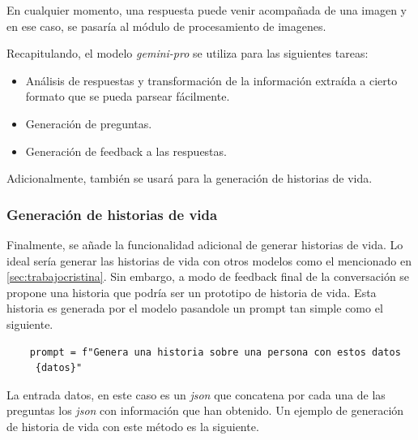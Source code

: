 En cualquier momento, una respuesta puede venir acompañada de una imagen y en ese caso, se pasaría al módulo de procesamiento de imagenes.

Recapitulando, el modelo \textit{gemini-pro} se utiliza para las siguientes tareas: 
\begin{itemize}
	\item Análisis de respuestas y transformación de la información extraída a cierto formato que se pueda parsear fácilmente.
	\item Generación de preguntas.
	\item Generación de feedback a las respuestas.
\end{itemize}

Adicionalmente, también se usará para la generación de historias de vida.

\subsubsection{Generación de historias de vida}
Finalmente, se añade la funcionalidad adicional de generar historias de vida. Lo ideal sería generar las historias de vida con otros modelos como el mencionado en \ref{sec:trabajocristina}. Sin embargo, a modo de feedback final de la conversación se propone una historia que podría ser un prototipo de historia de vida. Esta historia es generada por el modelo pasandole un prompt tan simple como el siguiente. 

\begin{verbatim}
	prompt = f"Genera una historia sobre una persona con estos datos
	 {datos}"
\end{verbatim}

La entrada datos, en este caso es un \textit{json} que concatena por cada una de las preguntas los \textit{json} con información que han obtenido. Un ejemplo de generación de historia de vida con este método es la siguiente. 

